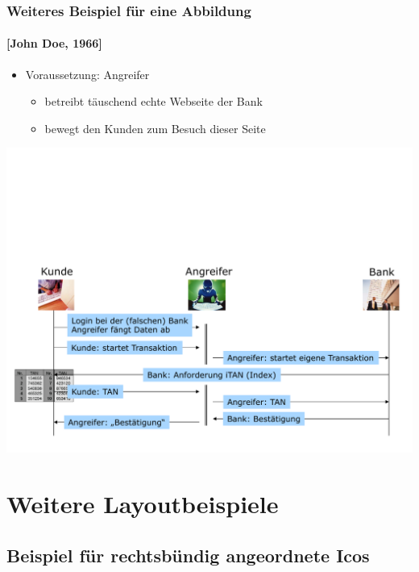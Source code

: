 \documentclass[t]{beamer}
\begin{document}
\begin{frame}
	\frametitle{Weiteres Beispiel für eine Abbildung}
	\framesubtitle{[John Doe, 1966] }
	\begin{itemize}
		\item Voraussetzung: {\color{black} Angreifer} 
			\begin{itemize}
				\item betreibt täuschend echte Webseite der Bank
				\item bewegt den Kunden zum Besuch dieser Seite
			\end{itemize}
	\end{itemize}
	\vspace{\fill}
	\begin{center}
		\includegraphics[width=\textwidth]{../pic/abbildung3.pdf}
	\end{center}
\end{frame}

\section{Weitere Layoutbeispiele} %
\subsection{Beispiel für rechtsbündig angeordnete Icos} %
\end{document}

